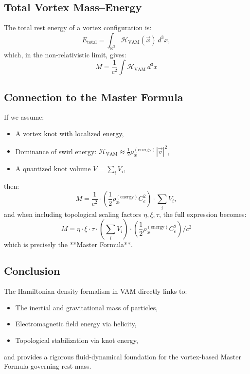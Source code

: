 \subsection*{Total Vortex Mass–Energy}

The total rest energy of a vortex configuration is:
\begin{equation}
E_\text{total} = \int_{\mathbb{R}^3} \mathcal{H}_\text{VAM}(\vec{x}) \, d^3x,
\end{equation}
which, in the non-relativistic limit, gives:
\[
M = \frac{1}{c^2} \int \mathcal{H}_\text{VAM} \, d^3x
\]

\subsection*{Connection to the Master Formula}

If we assume:
\begin{itemize}
    \item A vortex knot with localized energy,
    \item Dominance of swirl energy: \( \mathcal{H}_\text{VAM} \approx \frac{1}{2} \rho_\text{\ae}^{(\text{energy})} |\vec{v}|^2 \),
    \item A quantized knot volume \( V = \sum_i V_i \),
\end{itemize}
then:
\[
M = \frac{1}{c^2} \cdot \left( \frac{1}{2} \rho_\text{\ae}^{(\text{energy})} C_e^2 \right) \cdot \sum_i V_i,
\]
and when including topological scaling factors \( \eta, \xi, \tau \), the full expression becomes:
\[
M = \eta \cdot \xi \cdot \tau \cdot \left( \sum_i V_i \right) \cdot \left( \frac{1}{2} \rho_\text{\ae}^{(\text{energy})} C_e^2 \right) / c^2
\]
which is precisely the **Master Formula**.

\subsection*{Conclusion}

The Hamiltonian density formalism in VAM directly links to:
\begin{itemize}
    \item The inertial and gravitational mass of particles,
    \item Electromagnetic field energy via helicity,
    \item Topological stabilization via knot energy,
\end{itemize}
and provides a rigorous fluid-dynamical foundation for the vortex-based Master Formula governing rest mass.
